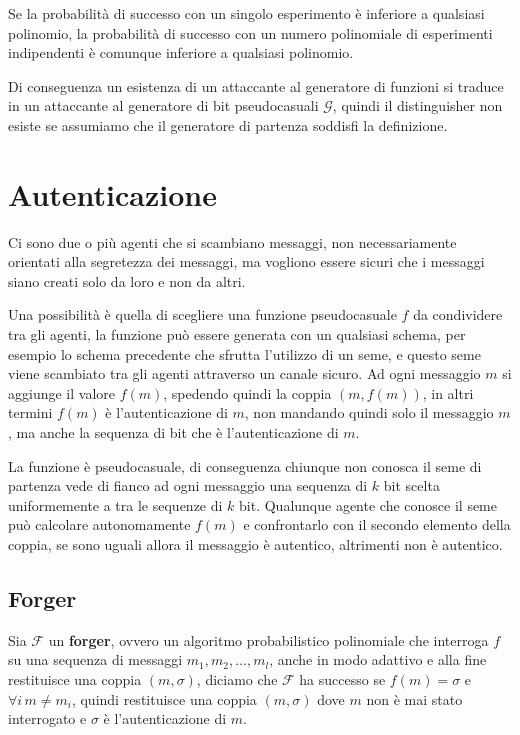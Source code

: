 Se la probabilità di successo con un singolo esperimento è inferiore a qualsiasi polinomio,
la probabilità di successo
con un numero polinomiale di esperimenti indipendenti è comunque inferiore a qualsiasi polinomio.

Di conseguenza un esistenza di un attaccante al generatore di funzioni si traduce 
in un attaccante al generatore di bit pseudocasuali $\mathcal{G}$, quindi 
il distinguisher non esiste se assumiamo  che il generatore di partenza soddisfi 
la definizione.

\section{Autenticazione}
Ci sono due o più agenti che si scambiano messaggi, non necessariamente orientati alla segretezza 
dei messaggi, ma vogliono essere sicuri che i messaggi siano creati solo da loro e non da altri.

Una possibilità è quella di scegliere una funzione pseudocasuale $f$ da condividere tra gli agenti, 
la funzione può essere generata con un qualsiasi schema, per esempio lo schema precedente che sfrutta 
l'utilizzo di un seme, e questo seme viene scambiato tra gli agenti attraverso un canale sicuro.
Ad ogni messaggio $m$ si aggiunge il valore $f(m)$, spedendo quindi la coppia $(m, f(m))$, in altri 
termini $f(m)$ è l'autenticazione di $m$, non mandando quindi solo il messaggio $m$, ma anche la 
sequenza di bit che è l'autenticazione di $m$.

La funzione è pseudocasuale, di conseguenza chiunque non conosca il seme di partenza vede di fianco 
ad ogni messaggio una sequenza di $k$ bit scelta uniformemente a tra le sequenze di $k$ bit. Qualunque 
agente che conosce il seme può calcolare autonomamente $f(m)$ e confrontarlo con il secondo elemento della 
coppia, se sono uguali allora il messaggio è autentico, altrimenti non è autentico.
\subsection{Forger}
Sia $\mathcal{F}$ un \textbf{forger}, ovvero un algoritmo probabilistico polinomiale che interroga $f$ su una 
sequenza di messaggi $m_1, m_2, \dots, m_l$, anche in modo adattivo e alla fine restituisce una coppia
$(m, \sigma)$, diciamo che $\mathcal{F}$ ha successo se $f(m) = \sigma$ e $\forall i \, m \neq m_i$, quindi 
restituisce una coppia $(m, \sigma)$ dove $m$ non è mai stato interrogato e $\sigma$ è l'autenticazione di $m$.

